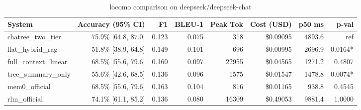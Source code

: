 \begin{table}[t]
\centering
\small
\begin{tabular}{lrrrrrrr}
\toprule
\textbf{System} & \textbf{Accuracy (95\% CI)} & \textbf{F1} & \textbf{BLEU-1} & \textbf{Peak Tok} & \textbf{Cost (USD)} & \textbf{p50 ms} & \textbf{p-val} \\
\midrule
chatree\_two\_tier & 75.9\% [64.8, 87.0] & 0.123 & 0.075 & 318 & \$0.09095 & 4893.6 & ref \\
flat\_hybrid\_rag & 51.8\% [38.9, 64.8] & 0.149 & 0.101 & 696 & \$0.00995 & 2696.9 & 0.0164* \\
full\_context\_linear & 68.5\% [55.6, 79.6] & 0.160 & 0.097 & 22955 & \$0.04565 & 1271.2 & 0.4807 \\
tree\_summary\_only & 55.6\% [42.6, 68.5] & 0.136 & 0.096 & 1575 & \$0.01547 & 1478.8 & 0.0074* \\
mem0\_official & 68.5\% [55.6, 79.6] & 0.163 & 0.104 & 816 & \$0.01165 & 938.8 & 0.4545 \\
rlm\_official & 74.1\% [61.1, 85.2] & 0.136 & 0.080 & 16309 & \$0.49053 & 9881.4 & 1.0000 \\
\bottomrule
\end{tabular}
\caption{locomo comparison on deepseek/deepseek-chat}
\label{tab:locomo}
\end{table}
